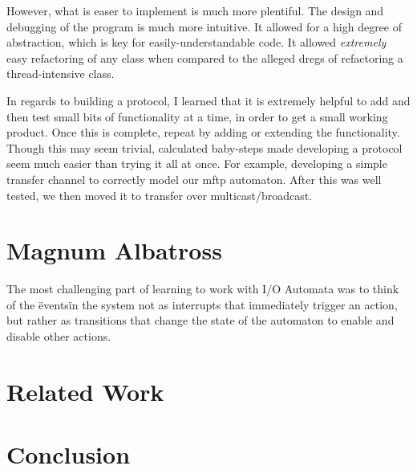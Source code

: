 \documentclass[letterpaper]{article}
\begin{document}
However, what is easer to implement is much more plentiful.
The design and debugging of the program is much more intuitive.
It allowed for a high degree of abstraction, which is key for easily-understandable code.
It allowed \emph{extremely} easy refactoring of any class when compared to the alleged dregs of refactoring a thread-intensive class.

In regards to building a protocol, I learned that it is extremely helpful to add and then test small bits of functionality at a time, in order to get a small working product.
Once this is complete, repeat by adding or extending the functionality.
Though this may seem trivial, calculated baby-steps made developing a protocol seem much easier than trying it all at once.
For example, developing a simple transfer channel to correctly model our mftp automaton.  After this was well tested, we then moved it to transfer over multicast/broadcast.

\section{Magnum Albatross}
The most challenging part of learning to work with I/O Automata was to think of the \"events\" in the system not as interrupts that immediately trigger an action, but rather as transitions that change the state of the automaton to enable and disable other actions.

\section{Related Work}

\section{Conclusion}
\end{document}
